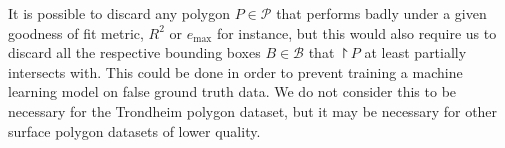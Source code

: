 It is possible to discard any polygon $P \in \mathcal{P}$ that performs badly under a given goodness of fit metric, $R^2$ or $e_{\mathrm{\max}}$ for instance, but this would also require us to discard all the respective bounding boxes $B \in \mathcal{B}$ that $\project{P}$ at least partially intersects with.
This could be done in order to prevent training a machine learning model on false ground truth data.
We do not consider this to be necessary for the Trondheim polygon dataset, but it may be necessary for other surface polygon datasets of lower quality.
%
%
